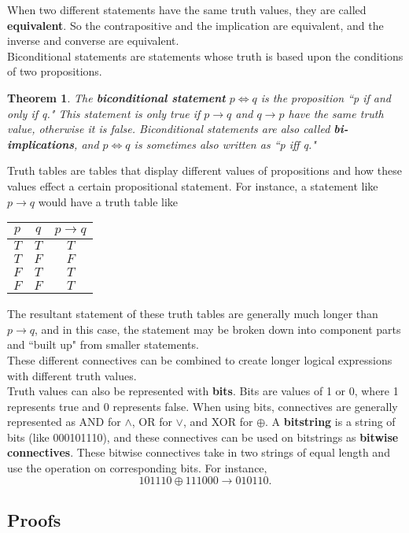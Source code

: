 \documentclass[12pt,letterpaper]{article}
\newtheorem{theorem}{Theorem}
\begin{document}
When two different statements have the same truth values, they are called \textbf{equivalent}. So the contrapositive and the implication are equivalent, and the inverse and converse are equivalent. \\

Biconditional statements are statements whose truth is based upon the conditions of two propositions. 

\begin{theorem}
	The \textbf{biconditional statement} $p \iff q$ is the proposition ``p if and only if q." This statement is only true if $p \rightarrow q$ and $q \rightarrow p$ have the same truth value, otherwise it is false. Biconditional statements are also called \textbf{bi-implications}, and $p \iff q$ is sometimes also written as ``p iff q."
\end{theorem}

Truth tables are tables that display different values of propositions and how these values effect a certain propositional statement. For instance, a statement like $p \rightarrow q$ would have a truth table like 

\begin{center}
\begin{tabular}{|c|c|c|}
	\hline
	$p$ & $q$ & $p \rightarrow q$ \\
	\hline
	$T$ & $T$ & $T$ \\
	\hline
	$T$ & $F$ & $F$ \\
	\hline
	$F$ & $T$ & $T$ \\
	\hline
	$F$ & $F$ & $T$ \\ 
	\hline 
\end{tabular}
\end{center}

The resultant statement of these truth tables are generally much longer than $p \rightarrow q$, and in this case, the statement may be broken down into component parts and ``built up" from smaller statements. \\

These different connectives can be combined to create longer logical expressions with different truth values. \\

Truth values can also be represented with \textbf{bits}. Bits are values of 1 or 0, where 1 represents true and 0 represents false. When using bits, connectives are generally represented as AND for $\wedge$, OR for $\vee$, and XOR for $\oplus$. A \textbf{bitstring} is a string of bits (like 000101110), and these connectives can be used on bitstrings as \textbf{bitwise connectives}. These bitwise connectives take in two strings of equal length and use the operation on corresponding bits. For instance, $$101110 \oplus 111000 \rightarrow 010110.$$ 

\subsection{Proofs}
\end{document}
